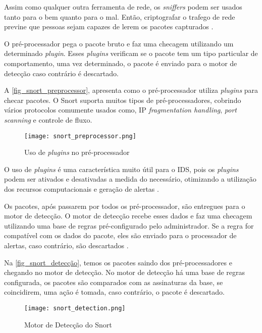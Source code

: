 Assim como qualquer outra ferramenta de rede, os \textit{sniffers} podem ser usados tanto para o bem quanto para o mal. Então, criptografar o trafego de rede previne que pessoas sejam capazes de lerem os pacotes capturados \cite{snort:andrew}.

O pré-processador pega o pacote bruto e faz uma checagem utilizando um determinado \textit{plugin}. Esses \textit{plugins} verificam se o pacote tem um tipo particular de comportamento, uma vez determinado, o pacote é enviado para o motor de detecção caso contrário é descartado.

A \autoref{fig_snort_preprocessor}, apresenta como o pré-processador utiliza \textit{plugins} para checar pacotes. O Snort suporta muitos tipos de pré-processadores, cobrindo vários protocolos comumente usados como, IP \textit{fragmentation handling}, \textit{port scanning} e controle de fluxo.

\begin{figure}[htb]
  \centering
  \caption{Uso de \textit{plugins} no pré-processador} \label{fig_snort_preprocessor}
  \texttt{[image: snort\_preprocessor.png]}
\end{figure}

O uso de \textit{plugins} é uma característica muito útil para o IDS, pois os \textit{plugins} podem ser ativados e desativadas a medida do necessário, otimizando a utilização dos recursos computacionais e geração de alertas \cite{snort:andrew}.

Os pacotes, após passarem por todos os pré-processador, são entregues para o motor de detecção. O motor de detecção recebe esses dados e faz uma checagem utilizando uma base de regras pré-configurado pelo administrador. Se a regra for compatível com os dados do pacote, eles são enviado para o processador de alertas, caso contrário, são descartados \cite{snort:andrew}.

Na \autoref{fig_snort_detecção}, temos os pacotes saindo dos pré-processadores e chegando no motor de detecção. No motor de detecção há uma base de regras configurada, os pacotes são comparados com as assinaturas da base, se coincidirem, uma ação é tomada, caso contrário, o pacote é descartado.

\begin{figure}[!htb]
  \centering
  \caption{Motor de Detecção do Snort} \label{fig_snort_detecção}
  \texttt{[image: snort\_detection.png]}
\end{figure}

